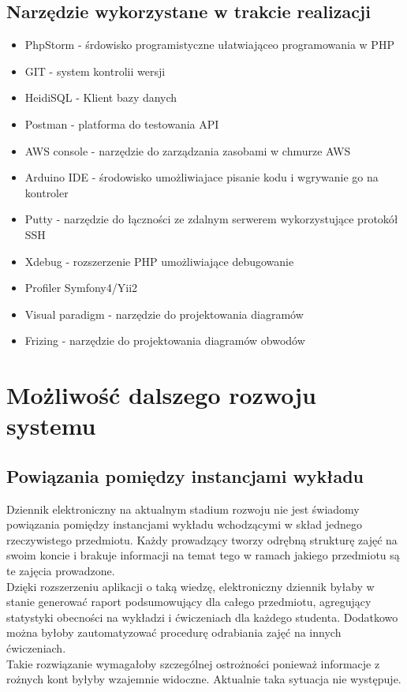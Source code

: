 \documentclass[declaration,shortabstract, mgr]{iithesis}
\begin{document}
\section{Narzędzie wykorzystane w trakcie realizacji}
\begin{itemize}
\item PhpStorm - śrdowisko programistyczne ułatwiająceo programowania w PHP
\item GIT - system kontrolii wersji
\item HeidiSQL - Klient bazy danych 
\item Postman - platforma do testowania API
\item AWS console - narzędzie do zarządzania zasobami w chmurze AWS
\item Arduino IDE - środowisko umożliwiajace pisanie kodu i wgrywanie go na kontroler
\item Putty - narzędzie do łączności ze zdalnym serwerem wykorzystujące protokół SSH
\item Xdebug - rozszerzenie PHP umożliwiające debugowanie
\item Profiler Symfony4/Yii2
\item Visual paradigm - narzędzie do projektowania diagramów
\item Frizing - narzędzie do projektowania diagramów obwodów
\end{itemize}

\chapter{Możliwość dalszego rozwoju systemu}
\section{Powiązania pomiędzy instancjami wykładu}
\indent Dziennik elektroniczny na aktualnym stadium rozwoju nie jest świadomy powiązania pomiędzy instancjami wykładu wchodzącymi w skład jednego rzeczywistego przedmiotu. Każdy prowadzący tworzy odrębną strukturę zajęć na swoim koncie i brakuje informacji na temat tego w ramach jakiego przedmiotu są te zajęcia prowadzone. \\
\indent Dzięki rozszerzeniu aplikacji o taką wiedzę, elektroniczny dziennik byłaby w stanie generować raport podsumowujący dla całego przedmiotu, agregujący statystyki obecności na wykładzi i ćwiczeniach dla każdego studenta. Dodatkowo można byłoby zautomatyzować procedurę odrabiania zajęć na innych ćwiczeniach. \\
\indent Takie rozwiązanie wymagałoby szczególnej ostrożności ponieważ informacje z rożnych kont byłyby wzajemnie widoczne. Aktualnie taka sytuacja nie występuje.
\end{document}
